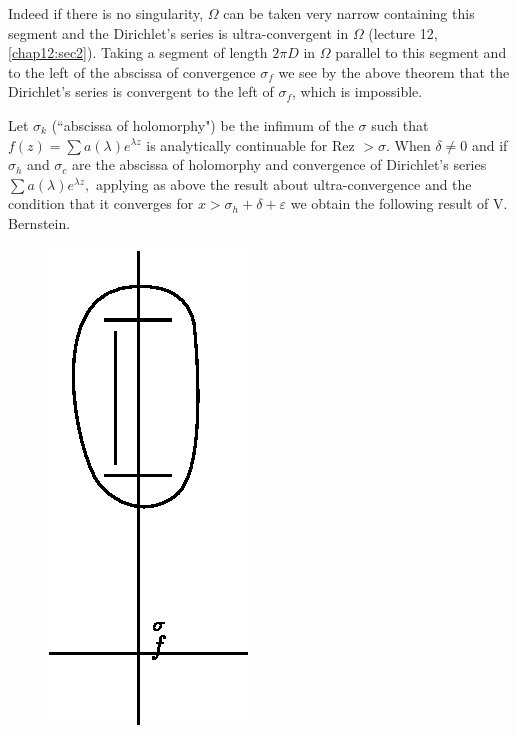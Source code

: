\noindent 
\begin{minipage}[c]{7cm}
 \begin{proof of the corollary}
 Indeed if there is no singularity, $\Omega$ can be taken very
 narrow containing this segment and the Dirichlet's series is
 ultra-convergent in $\Omega$ (lecture 12, \ref{chap12:sec2}). Taking a segment
 of length $2 \pi D$ in $\Omega$ parallel to this segment and to
 the left of the abscissa of convergence $\sigma_f $ we see by
 the above theorem that the Dirichlet's series is convergent to the
 left of $\sigma_f$, which is impossible. 
 \end{proof of the corollary}

 Let $\sigma_k$ (``abscissa of holomorphy") be the infimum of the
 $\sigma$ such that $f (z) = \sum a (\lambda) e^{\lambda z}$ is
 analytically continuable for Rez $ > \sigma$. When $\delta \neq 0$
 and if $ \sigma_h$ and $\sigma_c$ are the abscissa of holomorphy
 and convergence of Dirichlet's series $\sum a (\lambda) e^{\lambda
 z},$ applying as above the result about ultra-convergence and the
 condition that it converges for $ x > \sigma_h + \delta +
 \varepsilon$ we obtain the following result of V. Bernstein. 
\end{minipage}
\begin{minipage}[c]{2.9cm}
\begin{figure}[H]
\centerline{\includegraphics{vol15-figures/fig15-6.eps}}
\end{figure}
\end{minipage}
\medskip

